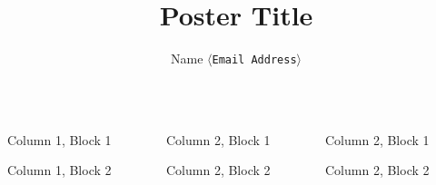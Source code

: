 \documentclass[final]{beamer}
\title{Poster Title}
\author{Name \small$\langle$\texttt{Email Address}$\rangle$}
\institute{Institute}
\begin{document}
\begin{frame}{} 
  \vfill
    
  \begin{columns}[t]
  
    \begin{column}{.3\linewidth}
    
    \begin{block}{Column 1, Block 1}
    \lipsum[1]
    \end{block}
    \vspace{1.3ex}
    
    \begin{block}{Column 1, Block 2}
    \lipsum[1]
    \end{block}
    \vspace{1.3ex}
      
    \end{column}
    
    \begin{column}{.3\linewidth}
    
    \begin{block}{Column 2, Block 1}
    \lipsum[1]
    \end{block}
    \vspace{1.3ex}
    
    \begin{block}{Column 2, Block 2}
    \lipsum[1]
    \end{block}
    \vspace{1.3ex}         
                             
    \end{column}
    
    \begin{column}{.3\linewidth}
	
	\begin{block}{Column 2, Block 1}
	\lipsum[1]
	\end{block}
	\vspace{1.3ex}
	
	\begin{block}{Column 2, Block 2}
	\lipsum[1]
	\end{block}
	\vspace{1.3ex}  
    
    \end{column}
    
    \end{columns}
      \vfill
    \end{frame}
    
    
\end{document}
